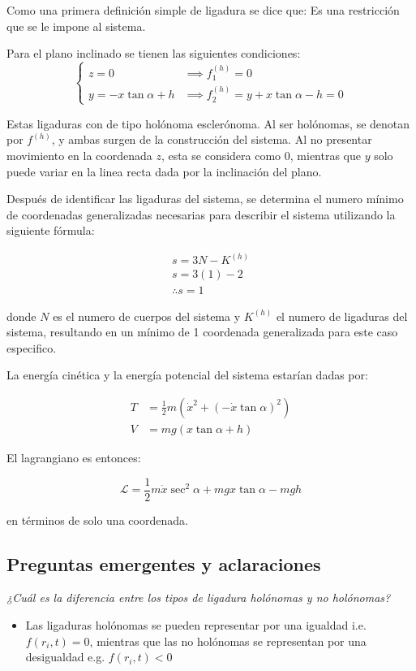 \documentclass{article}
\theoremstyle{definition}
\begin{document}
Como una primera definición simple de ligadura se dice que: Es una restricción que se le impone al sistema.

Para el plano inclinado se tienen las siguientes condiciones:
\begin{equation}
	\begin{cases}
		z = 0 &\implies f_1^{(h)} = 0 \\
		y = -x\tan{\alpha} + h &\implies f_2^{(h)} = y + x\tan{\alpha} - h = 0
	\end{cases}
\end{equation}

Estas ligaduras con de tipo holónoma esclerónoma. Al ser holónomas, se denotan por $f^{(h)}$, y ambas surgen de la construcción del sistema. Al no presentar movimiento en la coordenada $z$, esta se considera como $0$, mientras que $y$ solo puede variar en la linea recta dada por la inclinación del plano.

Después de identificar las ligaduras del sistema, se determina el numero mínimo de coordenadas generalizadas necesarias para describir el sistema utilizando la siguiente fórmula:

\begin{gather}
	s = 3N - K^{(h)} \label{eq:minim_coordinates}\\
	s = 3(1) - 2 \\
	\therefore s = 1
\end{gather}

donde $N$ es el numero de cuerpos del sistema y $K^{(h)}$ el numero de ligaduras del sistema, resultando en un mínimo de 1 coordenada generalizada para este caso especifico.

La energía cinética y la energía potencial del sistema estarían dadas por:

\begin{align}
	T &= \frac{1}{2} m \left(\dot{x}^2 + (-\dot{x}\tan{\alpha})^2 \right) \\
	V &= mg\left(x\tan{\alpha} + h \right)
\end{align}

El lagrangiano es entonces:

\begin{equation}
	\mathcal{L} = \frac{1}{2}m\dot{x}\sec^2{\alpha} + mgx\tan{\alpha} - mgh
\end{equation}

en términos de solo una coordenada.

\subsection{Preguntas emergentes y aclaraciones}
\emph{¿Cuál es la diferencia entre los tipos de ligadura holónomas y no holónomas?}
\begin{itemize}
	\item Las ligaduras holónomas se pueden representar por una igualdad i.e. $f(r_i, t) = 0$, mientras que las no holónomas se representan por una desigualdad e.g. $f(r_i, t) < 0$
\end{itemize}
\end{document}

